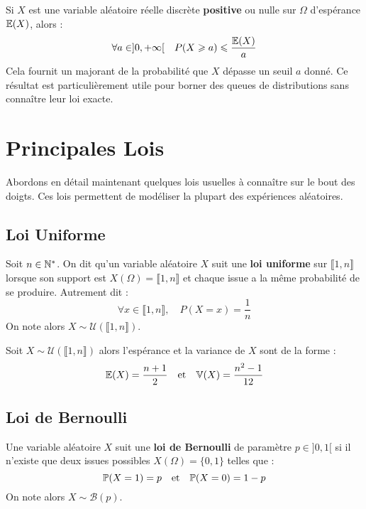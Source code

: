 \begin{theorem}
    Si $X$ est une variable aléatoire réelle discrète \textbf{positive} ou nulle sur $\Omega$ d'espérance $\mathbb{E}(X)$, alors :
        \[ \forall a \in ]0, + \infty [ \quad P(X \geqslant a) \leqslant \dfrac{\mathbb{E}(X)}{a} \]
    Cela fournit un majorant de la probabilité que $X$ dépasse un seuil $a$ donné.
    Ce résultat est particulièrement utile pour borner des queues de distributions sans connaître leur loi exacte.
\end{theorem}


\section{Principales Lois}

Abordons en détail maintenant quelques lois usuelles à connaître sur le bout des doigts. 
Ces lois permettent de modéliser la plupart des expériences aléatoires. 

\subsection{Loi Uniforme}

\begin{definition}
    Soit $n \in \mathbb{N}^*$. On dit qu'un variable aléatoire $X$ suit une \textbf{loi uniforme} sur $ \llbracket 1, n \rrbracket $ 
    lorsque son support est $X(\Omega) = \llbracket 1, n \rrbracket $ et chaque issue a la même probabilité de se produire. 
    Autrement dit : 
        \[ \forall x \in \llbracket 1, n \rrbracket, \quad P(X = x) = \frac{1}{n} \]
    On note alors $X \sim \mathcal{U}(\llbracket 1, n \rrbracket)$. 
\end{definition}

\begin{proposition}
    Soit $X \sim \mathcal{U}(\llbracket 1, n \rrbracket)$ alors l'espérance et la variance de $X$ sont de la forme : 
        \[ \mathbb{E}(X) = \frac{n+1}{2} \quad \text{et} \quad \mathbb{V}(X) = \frac{n^2-1}{12}  \] 
\end{proposition}

\subsection{Loi de Bernoulli}

\begin{definition}
    Une variable aléatoire $X$ suit une \textbf{loi de Bernoulli} de paramètre $p \in ]0,1[$ si il n'existe que deux issues 
    possibles $X(\Omega) = \{ 0,1 \}$ telles que : 
        \[ \mathbb{P}(X = 1) = p \quad \text{et} \quad \mathbb{P}(X = 0) = 1 - p \] 
    On note alors $X \sim \mathcal{B}(p)$.  
\end{definition}

